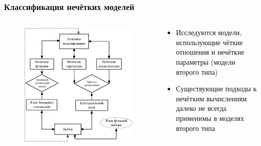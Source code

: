 \documentclass[12pt]{beamer}
\begin{document}
\begin{frame}
  \frametitle{Классификация нечётких моделей}
  \begin{columns}[onlytextwidth]
    \begin{column}{0.6\textwidth}
      \begin{figure}[h]
        \includegraphics[width=\textwidth]{choice-classification}
      \end{figure}
    \end{column}
    \begin{column}{0.4\textwidth}
      \begin{itemize}
        \item Исследуются модели, использующие чёткие отношения и нечёткие параметры (модели второго типа)
        \item Существующие подходы к нечётким вычислениям далеко не всегда применимы в моделях второго типа
      \end{itemize}
    \end{column}
  \end{columns}
\end{frame}


\end{document}
